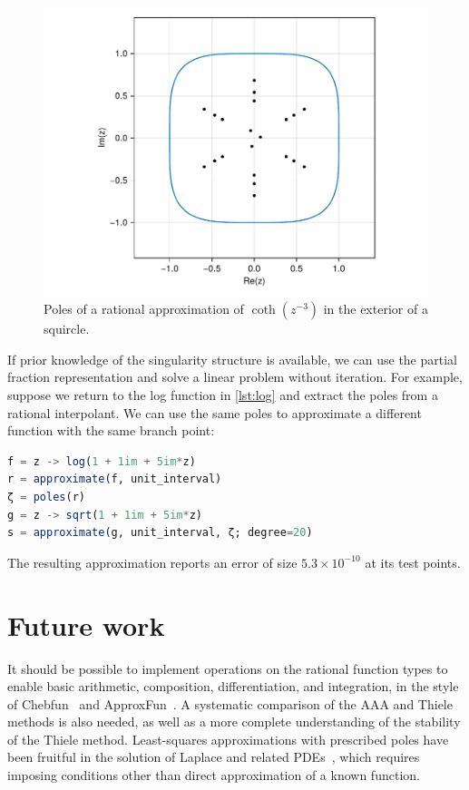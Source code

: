 \documentclass{juliacon}
\begin{document}
\begin{figure}
\centering
\includegraphics[width=\columnwidth]{squircle.pdf}
\caption{Poles of a rational approximation of $\coth(z^{-3})$ in the exterior of a squircle.}
\label{fig:squircle}
\end{figure}

If prior knowledge of the singularity structure is available, we can use the partial fraction representation and solve a linear problem without iteration. For example, suppose we return to the log function in \autoref{lst:log} and extract the poles from a rational interpolant. We can use the same poles to approximate a different function with the same branch point:
\begin{lstlisting}[language = Julia, caption={Partial fraction approximation of $\log(1 + i + 5iz)$.}]
f = z -> log(1 + 1im + 5im*z)
r = approximate(f, unit_interval)
ζ = poles(r)
g = z -> sqrt(1 + 1im + 5im*z)
s = approximate(g, unit_interval, ζ; degree=20)
\end{lstlisting}
The resulting approximation reports an error of size $5.3\times{10}^{-10}$ at its test points. 

\section{Future work}

It should be possible to implement operations on the rational function types to enable basic arithmetic, composition, differentiation, and integration, in the style of Chebfun~\cite{driscollChebfunGuide2014a} and \textsf{ApproxFun}~\cite{olverPracticalFramework2014}. A systematic comparison of the AAA and Thiele methods is also needed, as well as a more complete understanding of the stability of the Thiele method. Least-squares approximations with prescribed poles have been fruitful in the solution of Laplace and related PDEs~\cite{costaAAAleastSquares2023,gopalSolvingLaplace2019,gopalRepresentationConformal2019}, which requires imposing conditions other than direct approximation of a known function.


\end{document}
